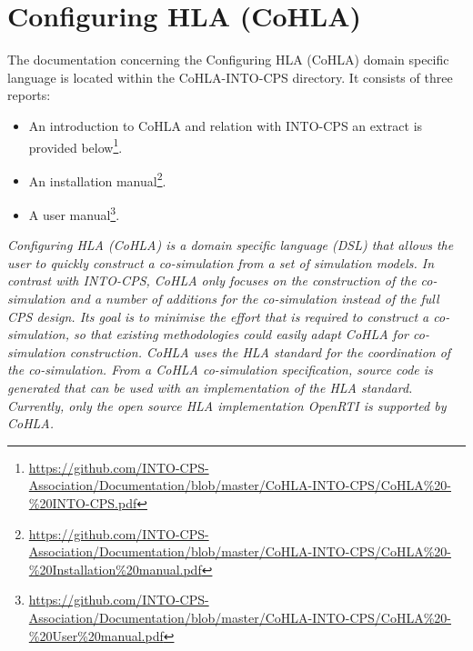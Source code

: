 \section{Configuring HLA (CoHLA)}\label{sec:CoHLA}
The documentation concerning the Configuring HLA (CoHLA) domain specific language is located within the CoHLA-INTO-CPS directory.
It consists of three reports:
\begin{itemize}
  \item An introduction to CoHLA and relation with INTO-CPS \dash an extract is provided below\footnote{\url{https://github.com/INTO-CPS-Association/Documentation/blob/master/CoHLA-INTO-CPS/CoHLA\%20-\%20INTO-CPS.pdf}}.
  \item An installation manual\footnote{\url{https://github.com/INTO-CPS-Association/Documentation/blob/master/CoHLA-INTO-CPS/CoHLA\%20-\%20Installation\%20manual.pdf}}.
  \item A user manual\footnote{\url{https://github.com/INTO-CPS-Association/Documentation/blob/master/CoHLA-INTO-CPS/CoHLA\%20-\%20User\%20manual.pdf}}.
\end{itemize}
{\itshape
  Configuring HLA (CoHLA) is a domain specific language (DSL) that allows the user to quickly
  construct a co-simulation from a set of simulation models. In contrast with INTO-CPS, CoHLA only
  focuses on the construction of the co-simulation and a number of additions for the co-simulation instead
  of the full CPS design. Its goal is to minimise the effort that is required to construct a co-simulation, so
  that existing methodologies could easily adapt CoHLA for co-simulation construction. CoHLA uses the
  HLA standard for the coordination of the co-simulation. From a CoHLA co-simulation specification,
  source code is generated that can be used with an implementation of the HLA standard. Currently, only
  the open source HLA implementation OpenRTI is supported by CoHLA.}

